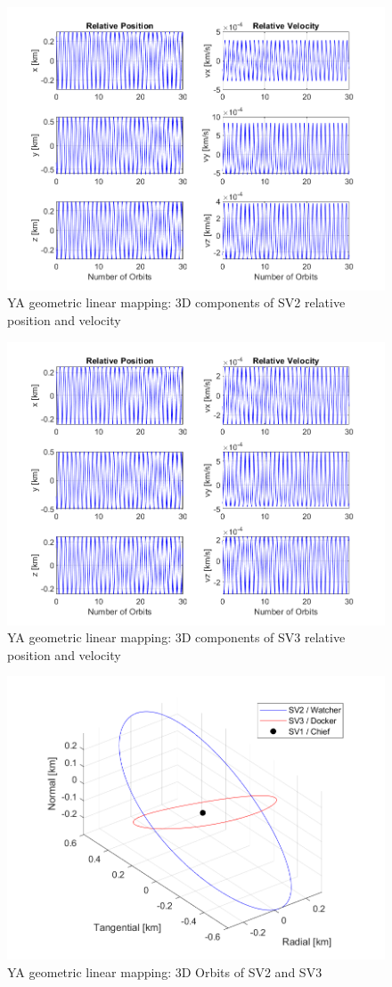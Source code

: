 \begin{figure}[H]
    \centering
    \includegraphics[width=0.7\linewidth]{sim/figures/PS3/YA_mapping_pos_vel_SV2.png}
    \caption{YA geometric linear mapping: 3D components of SV2 relative position and velocity}
    \label{fig:YA_map_3D_comp_SV2}
\end{figure}
\begin{figure}[H]
    \centering
    \includegraphics[width=0.7\linewidth]{sim/figures/PS3/YA_mapping_pos_vel_SV3.png}
    \caption{YA geometric linear mapping: 3D components of SV3 relative position and velocity}
    \label{fig:YA_map_3D_comp_SV3}
\end{figure}
\begin{figure}[H]
    \centering
    \includegraphics[width=0.7\linewidth]{sim/figures/PS3/YA_mapping_3D_orbits.png}
    \caption{YA geometric linear mapping: 3D Orbits of SV2 and SV3}
    \label{fig:YA_map_3D_orbits}
\end{figure}
